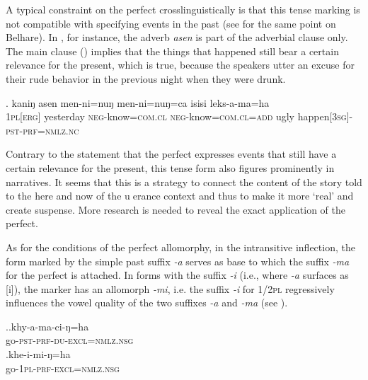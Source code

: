A typical constraint on the perfect crosslinguistically is that this tense marking is not compatible with specifying events in the past (see \citep[176]{Bickel1996Aspect} for the same point on Belhare). In \Next, for instance, the adverb \emph{asen} is part of the adverbial clause only. The main clause () implies that the things that happened still bear a certain relevance for the present, which is true, because the speakers utter an excuse for their rude behavior in the previous night when they were drunk.

\exg.	kaniŋ asen      men-ni=nuŋ         men-ni=nuŋ=ca                isisi leks-a-ma=ha\\
{\scshape  1pl[erg]} yesterday {\scshape neg-}know{\scshape =com.cl} {\scshape neg-}know{\scshape =com.cl=add} ugly happen{\scshape [3sg]-pst-prf=nmlz.nc}\\
 
	
Contrary to the statement that the perfect expresses events that still have a certain relevance for the present, this tense form also figures prominently in narratives. It seems that this is a strategy to connect the content of the story told to the here and now of the uerance context and thus to make it more ‘real’ and create suspense. More research is needed to reveal the exact application of the perfect.

As for the conditions of the perfect allomorphy, in the intransitive inflection, the form marked by the simple past suffix \emph{-a} serves as base to which the suffix \emph{-ma} for the perfect is attached. In forms with the suffix \emph{-i}  (i.e., where \emph{-a} surfaces as [i]), the marker has an allomorph \emph{-mi}, i.e. the suffix \emph{-i} for  {\scshape 1/2pl} regressively influences the vowel quality of the two suffixes \emph{-a} and \emph{-ma} (see \Next). 

\ex.\ag.khy-a-ma-ci-ŋ=ha\\
go{\scshape -pst-prf-du-excl=nmlz.nsg}\\
\bg.khe-i-mi-ŋ=ha\\
go{\scshape -1pl-prf-excl=nmlz.nsg}\\



